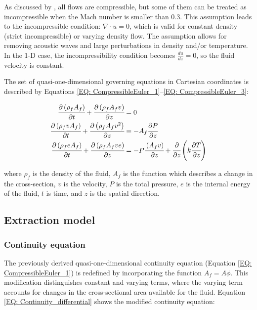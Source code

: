 \documentclass[a4paper,fleqn]{cas-dc}
\begin{document}
	As discussed by \citet{Anderson2023}, all flows are compressible, but some of them can be treated as incompressible when the Mach number is smaller than 0.3. This assumption leads to the incompressible condition: $\nabla \cdot u =0$, which is valid for constant density (strict incompressible) or varying density flow. The assumption allows for removing acoustic waves and large perturbations in density and/or temperature. In the 1-D case, the incompressibility condition becomes $\frac{du}{dz} = 0$, so the fluid velocity is constant.
	
	The set of quasi-one-dimensional governing equations in Cartesian coordinates is described by Equations \ref{EQ: CompressibleEuler_1}--\ref{EQ: CompressibleEuler_3}:
	
	{\footnotesize
		\begin{align}
			\label{EQ: CompressibleEuler_1}
			\cfrac{\partial \left( \rho_f A_f \right) }{\partial t} + \cfrac{\partial \left( \rho_f A_f v \right)}{\partial z} &= 0 \\
			\cfrac{\partial \left( \rho_f v A_f \right) }{\partial t} + \cfrac{\partial \left( \rho_f A_f v^2 \right)}{\partial z} &= -A_f \cfrac{\partial P}{\partial z} \label{EQ: CompressibleEuler_2} \\
			\cfrac{\partial \left( \rho_f e A_f \right) }{\partial t} + \cfrac{\partial \left( \rho_f A_f v e\right)}{\partial z} &= -P\cfrac{\left( A_f v \right)}{\partial z} + \cfrac{\partial}{\partial z} \left( k \cfrac{\partial T}{\partial z} \right)   
			\label{EQ: CompressibleEuler_3}
		\end{align}  
	}
	
	where $\rho_f$ is the density of the fluid, $A_f$ is the function which describes a change in the cross-section, $v$ is the velocity, $P$ is the total pressure, $e$ is the internal energy of the fluid, $t$ is time, and $z$ is the spatial direction.
	
	\subsection{Extraction model} \label{CH: Extraction_model}
	\subsubsection{Continuity equation} \label{CH: Continuity}
	
	The previously derived quasi-one-dimensional continuity equation (Equation \ref{EQ: CompressibleEuler_1}) is redefined by incorporating the function $A_f = A\phi$. This modification distinguishes constant and varying terms, where the varying term accounts for changes in the cross-sectional area available for the fluid. Equation \ref{EQ: Continuity_differential} shows the modified continuity equation:
	
\end{document}
